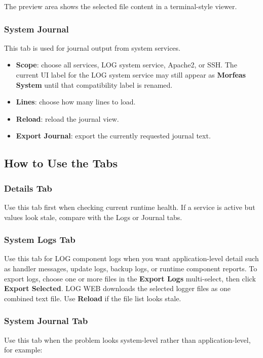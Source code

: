 \documentclass[11pt,a4paper]{article}
\begin{document}
The preview area shows the selected file content in a terminal-style viewer.

\subsubsection{System Journal}
This tab is used for journal output from system services.

\begin{itemize}
\item \textbf{Scope}: choose all services, LOG system service, Apache2, or SSH. The current UI label for the LOG system service may still appear as \textbf{Morfeas System} until that compatibility label is renamed.
\item \textbf{Lines}: choose how many lines to load.
\item \textbf{Reload}: reload the journal view.
\item \textbf{Export Journal}: export the currently requested journal text.
\end{itemize}

\subsection{How to Use the Tabs}
\subsubsection{Details Tab}
Use this tab first when checking current runtime health.
If a service is active but values look stale, compare with the Logs or Journal tabs.

\subsubsection{System Logs Tab}
Use this tab for LOG component logs when you want application-level detail such as handler messages, update logs, backup logs, or runtime component reports.
To export logs, choose one or more files in the \textbf{Export Logs} multi-select, then click \textbf{Export Selected}. LOG WEB downloads the selected logger files as one combined text file. Use \textbf{Reload} if the file list looks stale.

\subsubsection{System Journal Tab}
Use this tab when the problem looks system-level rather than application-level, for example:
\end{document}
